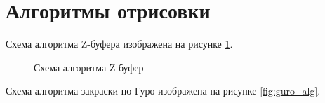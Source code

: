 \clearpage

\section{Алгоритмы отрисовки}

Схема алгоритма Z-буфера изображена на рисунке \ref{fig:z_buf_alg}.

\begin{figure}[ph!]
	\caption{Схема алгоритма Z-буфер}
	\label{fig:z_buf_alg}
\end{figure}

\clearpage

Схема алгоритма закраски по Гуро изображена на рисунке \ref{fig:guro_alg}.

